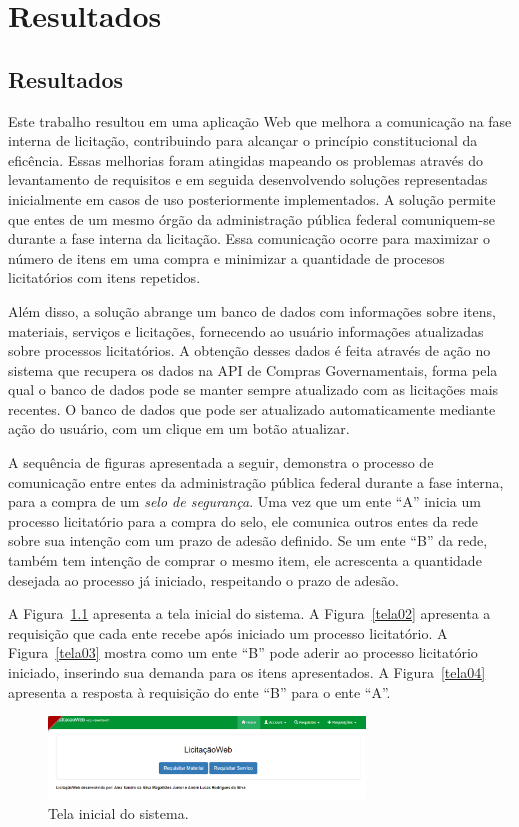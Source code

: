 \part{Resultados}

\chapter[Resultados]{Resultados}\label{Capitulo5}

Este trabalho resultou em uma aplicação Web que melhora a comunicação na fase interna de licitação, contribuindo para alcançar o princípio constitucional da eficência.
Essas melhorias foram atingidas mapeando os problemas através do levantamento de requisitos e em seguida desenvolvendo soluções representadas inicialmente em casos de uso posteriormente implementados.
A solução permite que entes de um mesmo órgão da administração pública federal comuniquem-se durante a fase interna da licitação.
Essa comunicação ocorre para maximizar o número de itens em uma compra e minimizar a quantidade de procesos licitatórios com itens repetidos.

Além disso, a solução abrange um banco de dados com informações sobre itens, materiais, serviços e licitações, fornecendo ao usuário informações atualizadas sobre processos licitatórios.
A obtenção desses dados é feita através de ação no sistema que recupera os dados na API de Compras Governamentais, forma pela qual o banco de dados pode se manter sempre atualizado com as licitações mais recentes.
O banco de dados que pode ser atualizado automaticamente mediante ação do usuário, com um clique em um botão atualizar.

A sequência de figuras apresentada a seguir, demonstra o processo de comunicação entre entes da administração pública federal durante a fase interna, para a compra de um \textit{selo de segurança}.
Uma vez que um ente ``A'' inicia um processo licitatório para a compra do selo, ele comunica outros entes da rede sobre sua intenção  com um prazo de adesão definido.
Se um ente ``B'' da rede, também tem intenção de comprar o mesmo item, ele acrescenta a quantidade desejada ao processo já iniciado, respeitando o prazo de adesão.

A Figura~\ref{tela01} apresenta a tela inicial do sistema.
A Figura~\ref{tela02} apresenta a requisição que cada ente recebe após iniciado um processo licitatório.
A Figura~\ref{tela03} mostra como um ente ``B'' pode aderir ao processo licitatório iniciado, inserindo sua demanda para os itens apresentados.
A Figura~\ref{tela04} apresenta a resposta  à requisição do ente ``B'' para o ente ``A''.
\begin{figure}[htp]
	\centering
	\includegraphics[width=0.75\textwidth]{figuras/prototipo001.png}
	\caption[PROT001: Tela home]{Tela inicial do sistema.}
	\label{tela01}
\end{figure}


